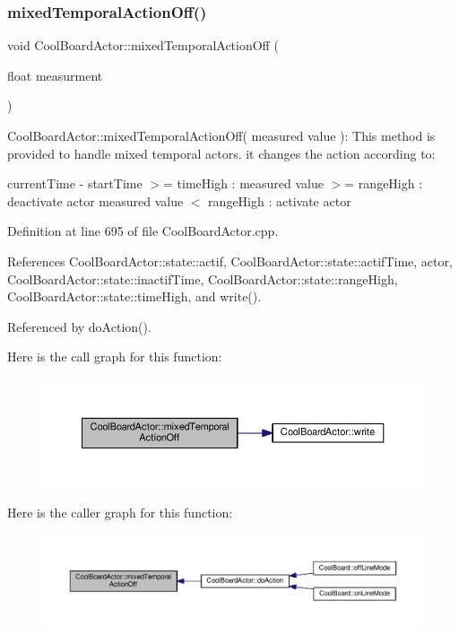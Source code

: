 \subsubsection{\texorpdfstring{mixed\+Temporal\+Action\+Off()}{mixedTemporalActionOff()}}
{\footnotesize\ttfamily void Cool\+Board\+Actor\+::mixed\+Temporal\+Action\+Off (\begin{DoxyParamCaption}\item[{float}]{measurment }\end{DoxyParamCaption})}

Cool\+Board\+Actor\+::mixed\+Temporal\+Action\+Off( measured value )\+: This method is provided to handle mixed temporal actors. it changes the action according to\+:

current\+Time -\/ start\+Time $>$= time\+High \+: measured value $>$= range\+High \+: deactivate actor measured value $<$ range\+High \+: activate actor 

Definition at line 695 of file Cool\+Board\+Actor.\+cpp.



References Cool\+Board\+Actor\+::state\+::actif, Cool\+Board\+Actor\+::state\+::actif\+Time, actor, Cool\+Board\+Actor\+::state\+::inactif\+Time, Cool\+Board\+Actor\+::state\+::range\+High, Cool\+Board\+Actor\+::state\+::time\+High, and write().



Referenced by do\+Action().

Here is the call graph for this function\+:
\nopagebreak
\begin{figure}[H]
\begin{center}
\leavevmode
\includegraphics[width=350pt]{dc/d69/class_cool_board_actor_a00b29c4abf0388551aa6812372113cf1_cgraph}
\end{center}
\end{figure}
Here is the caller graph for this function\+:
\nopagebreak
\begin{figure}[H]
\begin{center}
\leavevmode
\includegraphics[width=350pt]{dc/d69/class_cool_board_actor_a00b29c4abf0388551aa6812372113cf1_icgraph}
\end{center}
\end{figure}
\mbox{\label{class_cool_board_actor_a216aa7a0cfd1f31d0025cc91c2ecd5dd}} 
